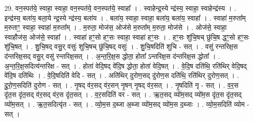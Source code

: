 \documentclass[17pt]{extarticle}
\begin{document}
29. वन॒स्पत॑ये॒ स्वाहा॒ स्वाहा॒ वन॒स्पत॑ये॒ वन॒स्पत॑ये॒ स्वाहा᳚ । . स्वाहेन्द्र॒स्ये न्द्र॑स्य॒ स्वाहा॒ स्वाहेन्द्र॑स्य । . इन्द्र॑स्य॒ बला॑य॒ बला॒ये न्द्र॒स्ये न्द्र॑स्य॒ बला॑य । . बला॑य॒ स्वाहा॒ स्वाहा॒ बला॑य॒ बला॑य॒ स्वाहा᳚ । . स्वाहा॑ म॒रुता᳚म् म॒रुताꣳ॒॒ स्वाहा॒ स्वाहा॑ म॒रुता᳚म् । . म॒रुता॒ मोज॑स॒ ओज॑से म॒रुता᳚म् म॒रुता॒ मोज॑से । . ओज॑से॒ स्वाहा॒ स्वाहौज॑स॒ ओज॑से॒ स्वाहा᳚ । . स्वाहा॑ हꣳ॒॒सो हꣳ॒॒सः स्वाहा॒ स्वाहा॑ हꣳ॒॒सः । . हꣳ॒॒सः शु॑चि॒षच् छु॑चि॒ष द्धꣳ॒॒सो हꣳ॒॒सः शु॑चि॒षत् । . शु॒चि॒षद् वसु॒र् वसुः॑ शुचि॒षच् छु॑चि॒षद् वसुः॑ । . शु॒चि॒षदिति॑ शुचि - सत् । . वसु॑ रन्तरिक्ष॒स द॑न्तरिक्ष॒सद् वसु॒र् वसु॑ रन्तरिक्ष॒सत् । . अ॒न्त॒रि॒क्ष॒स द्धोता॒ होता᳚ ऽन्तरिक्ष॒स द॑न्तरिक्ष॒स द्धोता᳚ । . अ॒न्त॒रि॒क्ष॒सदित्य॑न्तरिक्ष - सत् । . होता॑ वेदि॒षद् वे॑दि॒ष द्धोता॒ होता॑ वेदि॒षत् । . वे॒दि॒ष दति॑थि॒ रति॑थिर् वेदि॒षद् वे॑दि॒ष दति॑थिः । . वे॒दि॒षदिति॑ वेदि - सत् । . अति॑थिर् दुरोण॒सद् दु॑रोण॒स दति॑थि॒ रति॑थिर् दुरोण॒सत् । . दु॒रो॒ण॒सदिति॑ दुरोण - सत् । . नृ॒षद् व॑र॒सद् व॑र॒सन् नृ॒षन् नृ॒षद् व॑र॒सत् । . नृ॒षदिति॑ नृ - सत् । . व॒र॒स दृ॑त॒स दृ॑त॒सद् व॑र॒सद् व॑र॒स दृ॑त॒सत् । . व॒र॒सदिति॑ वर - सत् । . ऋ॒त॒सद् व्यो॑म॒सद् व्यो॑म॒स दृ॑त॒स दृ॑त॒सद् व्यो॑म॒सत् । . ऋ॒त॒सदित्यृ॑त - सत् । . व्यो॒म॒स द॒ब्जा अ॒ब्जा व्यो॑म॒सद् व्यो॑म॒स द॒ब्जाः । . व्यो॒म॒सदिति॑ व्योम - सत् । \newline
\end{document}
